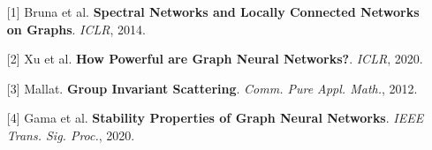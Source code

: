 \documentclass[final,dvipsnames]{beamer}
\begin{document}
\begin{frame}{}
\begin{columns}[t]
\begin{column}{0.29\linewidth}



 {\footnotesize
   \begin{itemize}
   \item[{[1]}]Bruna et al. \textbf{Spectral Networks and Locally Connected Networks on Graphs}. \emph{ICLR}, 2014.
   \item[{[2]}] Xu et al. \textbf{How Powerful are Graph Neural Networks?}. \emph{ICLR}, 2020.
   \item[{[3]}] Mallat. \textbf{Group Invariant Scattering}. \emph{Comm. Pure Appl. Math.}, 2012.
	\item[{[4]}] Gama et al. \textbf{Stability Properties of Graph Neural Networks}. \emph{IEEE Trans. Sig. Proc.}, 2020.
	
\end{itemize}
 }



\end{column}
\end{columns}




\end{frame}
\end{document}
